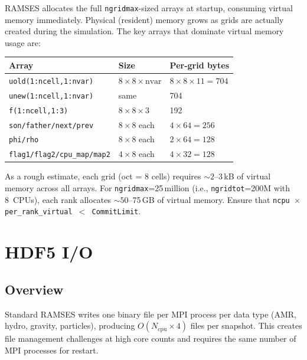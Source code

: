\documentclass[11pt,fleqn]{book}
\begin{document}
RAMSES allocates the full \texttt{ngridmax}-sized arrays at startup, consuming virtual memory immediately. Physical (resident) memory grows as grids are actually created during the simulation. The key arrays that dominate virtual memory usage are:

\begin{center}
\begin{tabular}{lll}
\toprule
\textbf{Array} & \textbf{Size} & \textbf{Per-grid bytes} \\
\midrule
\texttt{uold(1:ncell,1:nvar)} & $8 \times 8 \times \text{nvar}$ & $8 \times 8 \times 11 = 704$ \\
\texttt{unew(1:ncell,1:nvar)} & same & 704 \\
\texttt{f(1:ncell,1:3)} & $8 \times 8 \times 3$ & 192 \\
\texttt{son/father/next/prev} & $8 \times 8$ each & $4 \times 64 = 256$ \\
\texttt{phi/rho} & $8 \times 8$ each & $2 \times 64 = 128$ \\
\texttt{flag1/flag2/cpu\_map/map2} & $4 \times 8$ each & $4 \times 32 = 128$ \\
\bottomrule
\end{tabular}
\end{center}

\begin{remark}
As a rough estimate, each grid (oct = 8 cells) requires ${\sim}2$--$3$\,kB of virtual memory across all arrays. For \texttt{ngridmax}=25\,million (i.e., \texttt{ngridtot}=200M with 8~CPUs), each rank allocates ${\sim}50$--75\,GB of virtual memory. Ensure that \texttt{ncpu $\times$ per\_rank\_virtual $<$ CommitLimit}.
\end{remark}


\chapter{HDF5 I/O}
\label{ch:hdf5}

\section{Overview}

Standard RAMSES writes one binary file per MPI process per data type (AMR, hydro, gravity, particles), producing $O(N_{\text{cpu}} \times 4)$ files per snapshot. This creates file management challenges at high core counts and requires the same number of MPI processes for restart.
\end{document}

